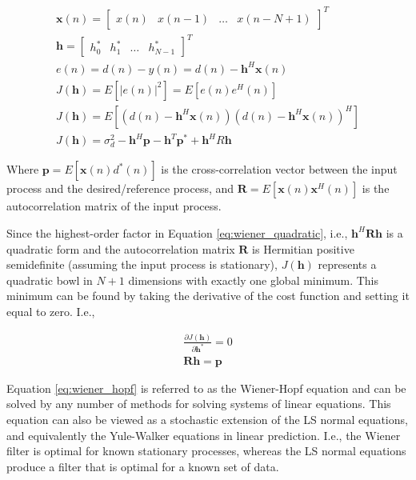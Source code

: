 \begin{eqnarray}
	\boldsymbol{x}(n) = 
	\begin{bmatrix}
		x(n) & x(n-1) & \dots & x(n-N+1)
	\end{bmatrix}^T \\
	\boldsymbol{h} = 
	\begin{bmatrix}
		h_0^* & h_1^* & \dots & h_{N-1}^*
	\end{bmatrix}^T \\
	e(n)=d(n) - y(n) = d(n) - \boldsymbol{h}^H\boldsymbol{x}(n) \\
	J(\boldsymbol{h}) = E\left[ \left| e(n) \right|^2 \right] = E\left[e(n)e^H(n)\right] \\
	J(\boldsymbol{h}) = E\left[
	\left(d(n) - \boldsymbol{h}^H\boldsymbol{x}(n)\right)
	\left(d(n) - \boldsymbol{h}^H\boldsymbol{x}(n)\right)^H
	\right] \label{eq:wiener_cost_fn_0} \\
	J(\boldsymbol{h}) = \sigma_d^2 - \boldsymbol{h}^H\boldsymbol{p} - \boldsymbol{h}^T\boldsymbol{p}^*+\boldsymbol{h}^H R \boldsymbol{h} \label{eq:wiener_quadratic}
\end{eqnarray}

\noindent
Where $\boldsymbol{p} = E \left[ \boldsymbol{x}(n)d^*(n) \right]$ is the cross-correlation vector between the input process and the desired/reference process, and $\boldsymbol{R} = E \left[ \boldsymbol{x}(n)\boldsymbol{x}^H (n) \right]$ is the autocorrelation matrix of the input process.

Since the highest-order factor in Equation \ref{eq:wiener_quadratic}, i.e., $\boldsymbol{h}^H \boldsymbol{R} \boldsymbol{h}$ is a quadratic form and the autocorrelation matrix $\boldsymbol{R}$ is Hermitian positive semidefinite (assuming the input process is stationary), $J(\boldsymbol{h})$ represents a quadratic bowl in $N+1$ dimensions with exactly one global minimum. This minimum can be found by taking the derivative of the cost function and setting it equal to zero. I.e.,


\begin{eqnarray}
	\frac{\partial J(\boldsymbol{h})}{\partial \boldsymbol{h}^*}=0 \\
	\boldsymbol{R} \boldsymbol{h} = \boldsymbol{p} \label{eq:wiener_hopf}
\end{eqnarray}

Equation \ref{eq:wiener_hopf} is referred to as the Wiener-Hopf equation and can be solved by any number of methods for solving systems of linear equations. This equation can also be viewed as a stochastic extension of the LS normal equations, and equivalently the Yule-Walker equations in linear prediction. I.e., the Wiener filter is optimal for known stationary processes, whereas the LS normal equations produce a filter that is optimal for a known set of data. 

